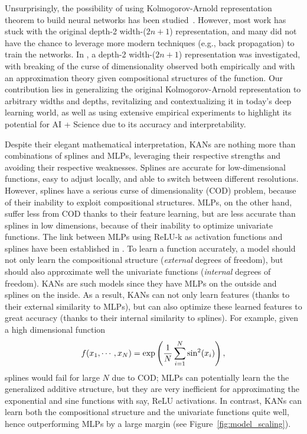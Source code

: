 \documentclass{article}
\numberwithin{equation}{section}
\numberwithin{figure}{section}
\begin{document}
Unsurprisingly, the possibility of using Kolmogorov-Arnold representation theorem to build neural networks has been studied~\cite{sprecher2002space,koppen2002training,lin1993realization,lai2021kolmogorov,leni2013kolmogorov,fakhoury2022exsplinet,montanelli2020error, he2023optimal}. However, most work has stuck with the original depth-2 width-($2n+1$) representation, and many did not have the chance to leverage more modern techniques (e.g., back propagation) to train the networks. In \cite{lai2021kolmogorov}, a depth-2 width-($2n+1$) representation was investigated, with breaking of the curse of dimensionality observed both empirically and with an approximation theory given compositional structures of the function. Our contribution lies in generalizing the original Kolmogorov-Arnold representation to arbitrary widths and depths, revitalizing and  contextualizing it in today's deep learning world, as well as using extensive empirical experiments to highlight its potential for AI + Science due to its accuracy and interpretability.

Despite their elegant mathematical interpretation, KANs are nothing more than  combinations of splines and MLPs, leveraging their respective strengths and avoiding their respective weaknesses. Splines are accurate for low-dimensional functions, easy to adjust locally, and able to switch between different resolutions. However, splines have a serious curse of dimensionality (COD) problem, because of their inability to exploit compositional structures. MLPs, on the other hand, suffer less from COD thanks to their feature learning, but are less accurate than splines in low dimensions, because of their inability to optimize univariate functions. The link between  MLPs using ReLU-k as activation functions and splines have been established in \cite{he2018relu, he2023deep}.  To learn a function accurately, a model should not only learn the compositional structure (\textit{external} degrees of freedom), but should also approximate well the univariate functions (\textit{internal} degrees of freedom). KANs are such models since they have MLPs on the outside and splines on the inside. As a result, KANs can not only learn features (thanks to their external similarity to MLPs), but can also optimize these learned features to great accuracy (thanks to their internal similarity to splines). For example, given a high dimensional function
\begin{align}
f(x_1,\cdots, x_N)=\exp\left(\frac{1}{N}\sum_{i=1}^N {\rm sin}^2 (x_i)\right), 
\end{align}
splines would fail for large $N$ due to COD; MLPs can potentially learn the the generalized additive structure, but they are very inefficient for approximating the exponential and sine functions with say, ReLU activations. In contrast, KANs can learn both the compositional structure and the univariate functions quite well, hence outperforming MLPs by a large margin (see Figure~\ref{fig:model_scaling}).
\end{document}
